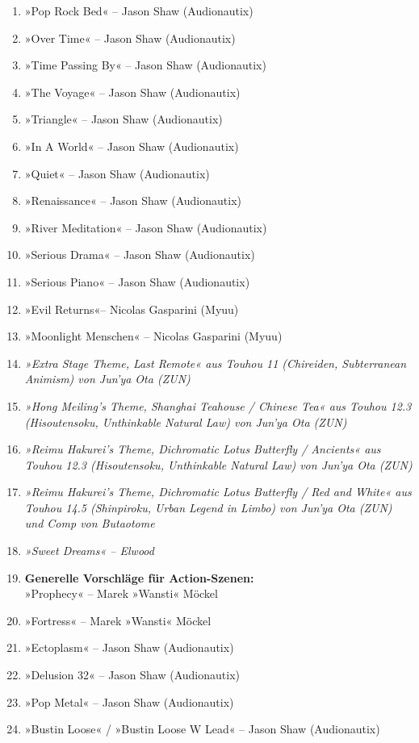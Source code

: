 \begin{enumerate}
    \item »Pop Rock Bed« – Jason Shaw (Audionautix)
    \item »Over Time« – Jason Shaw (Audionautix)
    \item »Time Passing By« – Jason Shaw (Audionautix)
    \item »The Voyage« – Jason Shaw (Audionautix)
    \item »Triangle« – Jason Shaw (Audionautix)
    \item »In A World« – Jason Shaw (Audionautix)
    \item »Quiet« – Jason Shaw (Audionautix)
    \item »Renaissance« – Jason Shaw (Audionautix)
    \item »River Meditation« – Jason Shaw (Audionautix)
    \item »Serious Drama« – Jason Shaw (Audionautix)
    \item »Serious Piano« – Jason Shaw (Audionautix)
    \item »Evil Returns«– Nicolas Gasparini (Myuu)
    \item »Moonlight Menschen« – Nicolas Gasparini (Myuu)
    \item \textit{»Extra Stage Theme, Last Remote« aus Touhou 11 (Chireiden, Subterranean Animism) von Jun'ya Ota (ZUN)}
    \item \textit{»Hong Meiling's Theme, Shanghai Teahouse / Chinese Tea« aus Touhou 12.3 (Hisoutensoku, Unthinkable Natural Law) von Jun'ya Ota (ZUN)}
    \item \textit{»Reimu Hakurei's Theme, Dichromatic Lotus Butterfly / Ancients« aus Touhou 12.3 (Hisoutensoku, Unthinkable Natural Law) von Jun'ya Ota (ZUN)}
    \item \textit{»Reimu Hakurei's Theme, Dichromatic Lotus Butterfly / Red and White« aus Touhou 14.5 (Shinpiroku, Urban Legend in Limbo) von Jun'ya Ota (ZUN) und Comp von Butaotome}
    \item \textit{»Sweet Dreams« – Elwood}
    \item \textbf{Generelle Vorschläge für Action-Szenen:}\\ »Prophecy« – Marek »Wansti« Möckel
    \item »Fortress« – Marek »Wansti« Möckel
    \item »Ectoplasm« – Jason Shaw (Audionautix)
    \item »Delusion 32« – Jason Shaw (Audionautix)
    \item »Pop Metal« – Jason Shaw (Audionautix)
    \item »Bustin Loose« / »Bustin Loose W Lead« – Jason Shaw (Audionautix)

\end{enumerate}
